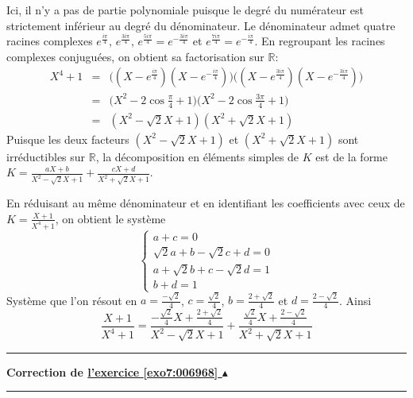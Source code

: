 \documentclass[11pt,a4paper]{article}
\newcommand{\Rr}{\mathbb{R}} \newcommand{\R}{\mathbb{R}}
\newcounter{exo}
\newcommand{\correction}[1]{\hypertarget{cor7:#1}{}\label{cor7:#1}{\bf Correction de \hyperlink{exo7:#1}{l'exercice \ref{exo7:#1} $\blacktriangle$}}\vspace{1mm}\hrule\vspace{1mm}}
\newcommand{\fincorrection}{\vspace{1mm}\hrule\vspace*{7mm}}
\begin{document}
\begin{enumerate}
Ici, il n'y a pas de partie polynomiale puisque le degré du numérateur 
est strictement inférieur au degré du dénominateur. 
Le dénominateur admet quatre racines complexes 
$e^{\frac{i\pi}{4}}$, $e^{\frac{3i\pi}{4}}$, $e^{\frac{5i\pi}{4}}=e^{-\frac{3i\pi}{4}}$ et 
$e^{\frac{7i\pi}{4}}=e^{-\frac{i\pi}{4}}$. 
En regroupant les racines complexes conjuguées, on obtient sa factorisation sur $\Rr$:
\begin{eqnarray*}
X^4+1 &=& \big( (X-e^{\frac{i\pi}{4}})(X-e^{-\frac{i\pi}{4}}) \big)\big( (X-e^{\frac{3i\pi}{4}})(X-e^{-\frac{3i\pi}{4}}) \big) \\
      &=&\big(X^2-2\cos\tfrac{\pi}{4}+1\big)\big(X^2-2\cos\tfrac{3\pi}{4}+1\big)\\
      &=&(X^2-\sqrt{2}X+1)(X^2+\sqrt{2}X+1)
\end{eqnarray*}
Puisque les deux facteurs $(X^2-\sqrt{2}X+1)$ et $(X^2+\sqrt{2}X+1)$ sont irréductibles sur $\R$, la décomposition en éléments simples de $K$ est de la forme
$K=\frac{aX+b}{X^2-\sqrt{2}X+1}+\frac{cX+d}{X^2+\sqrt{2}X+1}$.

En réduisant au même dénominateur et en identifiant les coefficients avec ceux de $K=\frac{X+1}{X^4+1}$, 
on obtient le système
$$\left\{\begin{array}{l}
a+c=0\\
\sqrt{2}a+b-\sqrt{2}c+d=0\\
a+\sqrt{2}b+c-\sqrt{2}d=1\\
b+d=1
\end{array}\right.$$
Système que l'on résout en $a=\frac{-\sqrt{2}}{4}$, $c=\frac{\sqrt{2}}{4}$, $b=\frac{2+\sqrt{2}}{4}$ et $d=\frac{2-\sqrt{2}}{4}$. Ainsi
$$\frac{X+1}{X^4+1} = \frac{-\frac{\sqrt{2}}{4}X+\frac{2+\sqrt{2}}{4}}{X^2-\sqrt{2}X+1} + \frac{\frac{\sqrt{2}}{4}X+\frac{2-\sqrt{2}}{4}}{X^2+\sqrt{2}X+1}$$ 
\end{enumerate}
\fincorrection
\correction{006968}\ 
\end{document}
